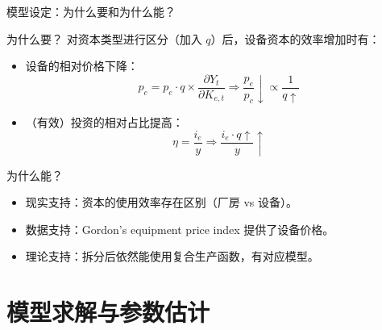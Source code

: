 \documentclass[aspectratio=169,10pt]{beamer}
\begin{document}
\begin{frame}{模型设定：为什么要和为什么能？}
  \begin{block}{为什么要？}
    对资本类型进行区分（加入 $q$）后，设备资本的效率增加时有：
    \begin{itemize}
      \item 设备的相对价格下降：
            $$ p_c = {p_e} \cdot q  \times \dfrac{\partial Y_t}{\partial K_{e,t}} \Rightarrow \dfrac{p_e}{p_c} \downarrow \propto \dfrac{1}{q \uparrow} $$
      \item （有效）投资的相对占比提高：
            $$ \eta = \frac{i_e}{y} \Rightarrow \dfrac{i_e \cdot q \uparrow}{y} \uparrow $$
    \end{itemize}
  \end{block}

  \begin{block}{为什么能？}
    \begin{itemize}
      \item 现实支持：资本的使用效率存在区别（厂房 vs 设备）。
      \item 数据支持：Gordon's equipment price index 提供了设备价格。
      \item 理论支持：拆分后依然能使用复合生产函数，有对应模型。
    \end{itemize}
  \end{block}

\end{frame}

\section{模型求解与参数估计}
\end{document}
